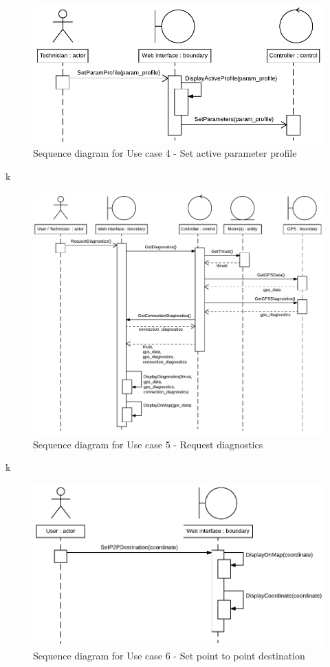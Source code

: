 \begin{figure}[H]
	\centering
	\includegraphics[width=1\linewidth]{Images/System_architecture/Use_case_4_SD}
	\caption{Sequence diagram for Use case 4 - Set active parameter profile}
\end{figure}

k

\begin{figure}[H]
	\centering
	\includegraphics[width=1\linewidth]{Images/System_architecture/Use_case_5_SD}
	\caption{Sequence diagram for Use case 5 - Request diagnostics}
\end{figure}

k

\begin{figure}[H]
	\centering
	\includegraphics[width=1\linewidth]{Images/System_architecture/Use_case_6_SD}
	\caption{Sequence diagram for Use case 6 - Set point to point destination}
\end{figure}

